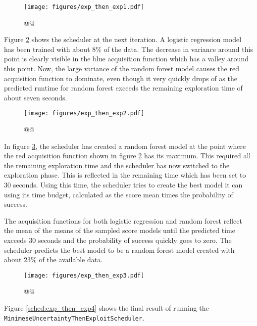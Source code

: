 \documentclass[a4paper,12pt,twoside,openright]{report}
\begin{document}
\begin{figure}
\centering
  \texttt{[image: figures/exp\_then\_exp1.pdf]}
  \caption{@@}
  \label{sched:exp_then_exp1}
\end{figure}

Figure \ref{sched:exp_then_exp2} shows the scheduler at the next iteration. A logistic regression model has been trained with about 8\% of the data. The decrease in variance around this point is clearly visible in the blue acquisition function which has a valley around this point. Now, the large variance of the random forest model causes the red acquisition function to dominate, even though it very quickly drops of as the predicted runtime for random forest exceeds the remaining exploration time of about seven seconds.

\begin{figure}
\centering
  \texttt{[image: figures/exp\_then\_exp2.pdf]}
  \caption{@@}
  \label{sched:exp_then_exp2}
\end{figure}

In figure \ref{sched:exp_then_exp3}, the scheduler has created a random forest model at the point where the red acquisition function shown in figure \ref{sched:exp_then_exp2} has its maximum. This required all the remaining exploration time and the scheduler has now switched to the exploration phase. This is reflected in the remaining time which has been set to 30 seconds. Using this time, the scheduler tries to create the best model it can using its time budget, calculated as the score mean times the probability of success.

The acquisition functions for both logistic regression and random forest reflect the mean of the means of the sampled score models until the predicted time exceeds 30 seconds and the probability of success quickly goes to zero. The scheduler predicts the best model to be a random forest model created with about 23\% of the available data.

\begin{figure}
\centering
  \texttt{[image: figures/exp\_then\_exp3.pdf]}
  \caption{@@}
  \label{sched:exp_then_exp3}
\end{figure}

Figure \ref{sched:exp_then_exp4} shows the final result of running the \texttt{MinimeseUncertaintyThenExploitScheduler}. %
\end{document}
